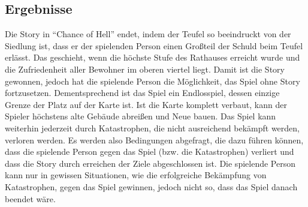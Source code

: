 \documentclass[paper=A4,pagesize=auto,12pt,headinclude=true,footinclude=true,BCOR=0mm,DIV=calc]{scrartcl}
\newcommand{\sectionspace}{
	\vspace{0.5cm}
}
\newcommand{\gametitle}{Chance of Hell}
\begin{document}
\sectionspace
\subsection{Ergebnisse}\label{sec:Ergebnisse}
Die Story in "`\gametitle"' endet, indem der Teufel so beeindruckt von der Siedlung ist, dass er der spielenden Person einen Großteil der Schuld beim Teufel erlässt. Das geschieht, wenn die höchste Stufe des Rathauses erreicht wurde und die Zufriedenheit aller Bewohner im oberen viertel liegt. Damit ist die Story gewonnen, jedoch hat die spielende Person die Möglichkeit, das Spiel ohne Story fortzusetzen. Dementsprechend ist das Spiel ein Endlosspiel, dessen einzige Grenze der Platz auf der Karte ist. Ist die Karte komplett verbaut, kann der Spieler höchstens alte Gebäude abreißen und Neue bauen. Das Spiel kann weiterhin jederzeit durch Katastrophen, die nicht ausreichend bekämpft werden, verloren werden.
Es werden also Bedingungen abgefragt, die dazu führen können, dass die spielende Person gegen das Spiel (bzw. die Katastrophen) verliert und dass die Story durch erreichen der Ziele abgeschlossen ist. Die spielende Person kann nur in gewissen Situationen, wie die erfolgreiche Bekämpfung von Katastrophen, gegen das Spiel gewinnen, jedoch nicht so, dass das Spiel danach beendet wäre.


\sectionspace
\newpage
\printbibliography[heading=bibnumbered, title=Referenzen]\label{sec:Referenzen}
\end{document}
